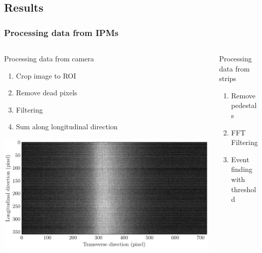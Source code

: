 \subsection{Results}
\begin{frame}[t]
  \frametitle{Processing data from IPMs}
  \begin{columns}[T]
    \begin{column}{0.45\textwidth}
      \begin{block}{Processing data from camera}
        \begin{enumerate}
          \item Crop image to ROI
          \item Remove dead pixels
          \item Filtering
          \item Sum along longitudinal direction
        \end{enumerate}
      \end{block}
      \begin{center}
        \includegraphics[width=1\textwidth]{04_Test/fig/fig000_image_beam}
      \end{center}
    \end{column}
    \begin{column}{0.45\textwidth}
      \begin{block}{Processing data from strips}
        \begin{enumerate}
          \item Remove pedestals
          \item FFT Filtering
          \item Event finding with threshold

\end{enumerate}
\end{block}
\end{column}
\end{columns}
\end{frame}
